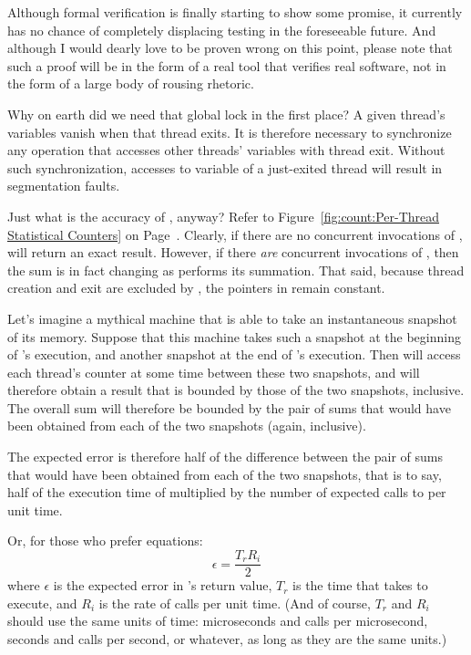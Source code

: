 \begin{enumerate}
	Although formal verification is finally starting to show some
	promise, it currently has no chance of completely displacing testing
	in the foreseeable future.
	And although I would dearly love to be proven wrong on this point,
	please note that such a proof will be in the form of a real tool
	that verifies real software, not in the form of a large body of
	rousing rhetoric.

\QuickQ{}
	Why on earth did we need that global lock in the first place?
\QuickA{}
	A given thread's  variables vanish when that
	thread exits.
	It is therefore necessary to synchronize any operation that
	accesses other threads'  variables with
	thread exit.
	Without such synchronization, accesses to  variable
	of a just-exited thread will result in segmentation faults.

\QuickQ{}
	Just what is the accuracy of , anyway?
\QuickA{}
	Refer to
	Figure~\ref{fig:count:Per-Thread Statistical Counters} on
	Page~\pageref{fig:count:Per-Thread Statistical Counters}.
	Clearly, if there are no concurrent invocations of ,
	 will return an exact result.
	However, if there \emph{are} concurrent invocations of
	, then the sum is in fact changing as
	 performs its summation.
	That said, because thread creation and exit are excluded by
	, the pointers in  remain constant.

	Let's imagine a mythical machine that is able to take an
	instantaneous snapshot of its memory.
	Suppose that this machine takes such a snapshot at the
	beginning of 's execution, and another
	snapshot at the end of 's execution.
	Then  will access each thread's counter
	at some time between these two snapshots, and will therefore
	obtain a result that is bounded by those of the two snapshots,
	inclusive.
	The overall sum will therefore be bounded by the pair of sums that
	would have been obtained from each of the two snapshots (again,
	inclusive).

	The expected error is therefore half of the difference between
	the pair of sums that would have been obtained from each of the
	two snapshots, that is to say, half of the execution time of
	 multiplied by the number of expected calls to
	 per unit time.

	Or, for those who prefer equations:
	\begin{equation}
	\epsilon = \frac{T_r R_i}{2}
	\end{equation}
	where $\epsilon$ is the expected error in 's
	return value,
	$T_r$ is the time that  takes to execute,
	and $R_i$ is the rate of  calls per unit time.
	(And of course, $T_r$ and $R_i$ should use the same units of
	time: microseconds and calls per microsecond, seconds and calls
	per second, or whatever, as long as they are the same units.)


\end{enumerate}

